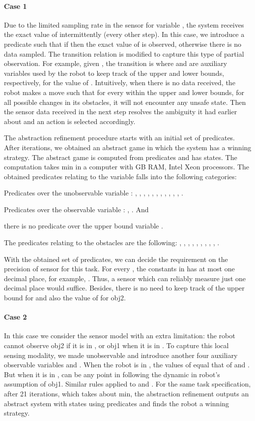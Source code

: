 \documentclass[letterpaper, 10 pt, conference]{ieeeconf}
\begin{document}
\paragraph*{Case 1}
Due to the limited sampling rate in the sensor for variable , the
system receives the exact value of  intermittently (every other
step). In this case, we introduce a predicate  such that if  
then the exact value of  is observed, otherwise there is no data
sampled. The transition relation  is modified to
capture this type of partial observation. For example, given , the transition is  where  and 
are auxiliary variables used by the robot to keep track of the upper
and lower bounds, respectively, for the value of . Intuitively,
when there is no data received, the robot makes a move such that for
every  within the upper and lower bounds, for all possible changes
in its obstacles, it will not encounter any unsafe state.  Then the
sensor data received in the next step resolves the ambiguity it
had earlier about  and an action is selected accordingly.


The abstraction refinement procedure starts with an initial set of
 predicates. After  iterations, we obtained an abstract game
in which the system has a winning strategy. The abstract game is
computed from  predicates and has  states. The computation
takes  min in a computer with  GB RAM, Intel Xeon
processors. The obtained predicates relating to the variable  falls
into the following categories:
\begin{inparaenum}[(1)]\item
Predicates over the unobservable variable : , , , , , , , , , , , .
\item
Predicates over the observable variable :  , . And \item there is no predicate over the upper bound
variable .
\end{inparaenum} The predicates relating to the obstacles  are the following: , , , , , , , , , . 

With the obtained set   of predicates, we can decide the
requirement on the precision of sensor for this task. For
every  , the constants in  has at most one
decimal place, for example, . Thus, a sensor which can
reliably measure just one decimal place would suffice. Besides, there is no need to keep track of the upper bound  for
 and also the value of   for obj2.

\paragraph*{Case 2}In this case we consider the sensor model with an
extra limitation: the robot cannot observe obj2 if it is in , or
obj1 when it is in . To capture this local sensing modality, we
made  unobservable and introduce another four
auxiliary observable variables  and . When
the robot is in , the values of  equal that of 
and . But when it is in ,  can be any point
in  following the dynamic in robot's assumption of obj1.  Similar
rules applied to  and . For the same task
specification, after 21 iterations, which takes about  min, the
abstraction refinement outputs an abstract system with  states
using  predicates and finds the robot a winning strategy.
\end{document}
